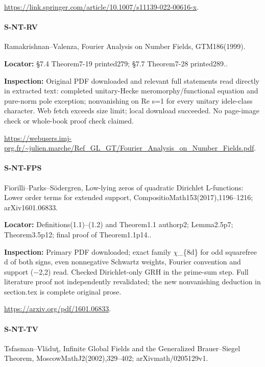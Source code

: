 \documentclass[11pt,a4paper]{article}
\begin{document}
\url{https://link.springer.com/article/10.1007/s11139-022-00616-x}.

\paragraph{S-NT-RV} Ramakrishnan–\allowbreak{}Valenza, Fourier Analysis on Number Fields, GTM186(1999).

\textbf{Locator:} §7.\allowbreak{}4 Theorem7-19 printed279; §7.\allowbreak{}7 Theorem7-28 printed289.\allowbreak{}.

\textbf{Inspection:} Original PDF downloaded and relevant full statements read directly in extracted text:\allowbreak{} completed unitary-Hecke meromorphy/\allowbreak{}functional equation and pure-norm pole exception; nonvanishing on Re s=1 for every unitary idele-class character.\allowbreak{} Web fetch exceeds size limit; local download succeeded.\allowbreak{} No page-image check or whole-book proof check claimed.\allowbreak{}

\url{https://webusers.imj-prg.fr/~julien.marche/Ref_GL_GT/Fourier_Analysis_on_Number_Fields.pdf}.

\paragraph{S-NT-FPS} Fiorilli–\allowbreak{}Parks–\allowbreak{}Södergren, Low-lying zeros of quadratic Dirichlet L-functions:\allowbreak{} Lower order terms for extended support, CompositioMath153(2017),1196–\allowbreak{}1216; arXiv1601.\allowbreak{}06833.

\textbf{Locator:} Definitions(1.\allowbreak{}1)–\allowbreak{}(1.\allowbreak{}2) and Theorem1.\allowbreak{}1 authorp2; Lemma2.\allowbreak{}5p7; Theorem3.\allowbreak{}5p12; final proof of Theorem1.\allowbreak{}1p14.\allowbreak{}.

\textbf{Inspection:} Primary PDF downloaded; exact family \ensuremath{\chi}\_\allowbreak{}\{8d\} for odd squarefree d of both signs, even nonnegative Schwartz weights, Fourier convention and support (\ensuremath{-}2,2) read.\allowbreak{} Checked Dirichlet-only GRH in the prime-sum step.\allowbreak{} Full literature proof not independently revalidated; the new nonvanishing deduction in section.\allowbreak{}tex is complete original prose.\allowbreak{}

\url{https://arxiv.org/pdf/1601.06833}.

\paragraph{S-NT-TV} Tsfasman–\allowbreak{}Vlăduţ, Infinite Global Fields and the Generalized Brauer–\allowbreak{}Siegel Theorem, MoscowMathJ2(2002),329–\allowbreak{}402; arXivmath/\allowbreak{}0205129v1.
\end{document}

